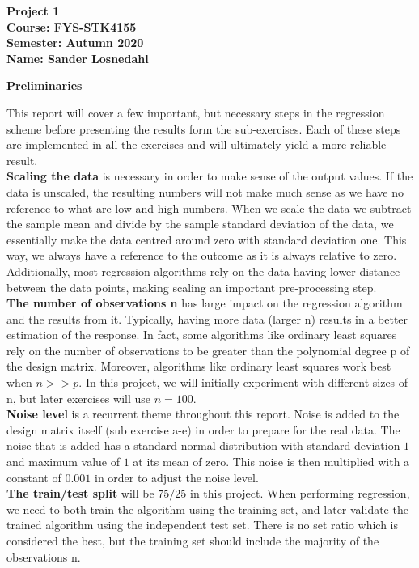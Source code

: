 \documentclass[12pt,a4paper]{article}
\begin{document}
\begin{center}
\LARGE{\textbf{Project 1}}
\\
\large{\textbf{Course: FYS-STK4155}}
\\
\large{\textbf{Semester: Autumn 2020}}
\\
\large{\textbf{Name: Sander Losnedahl}}
\end{center}


\newpage

\begin{center}
\Large{\textbf{Preliminaries}}
\end{center}

\noindent This report will cover a few important, but necessary steps in the regression scheme before presenting the results form the sub-exercises. Each of these steps are implemented in all the exercises and will ultimately yield a more reliable result.
\\
\textbf{Scaling the data} is necessary in order to make sense of the output values. If the data is unscaled, the resulting numbers will not make much sense as we have no reference to what are low and high numbers. When we scale the data we subtract the sample mean and divide by the sample standard deviation of the data, we essentially make the data centred around zero with standard deviation one. This way, we always have a reference to the outcome as it is always relative to zero. Additionally, most regression algorithms rely on the data having lower distance between the data points, making scaling an important pre-processing step.
\\
\textbf{The number of observations n} has large impact on the regression algorithm and the results from it. Typically, having more data (larger n) results in a better estimation of the response. In fact, some algorithms like ordinary least squares rely on the number of observations to be greater than the polynomial degree p of the design matrix. Moreover, algorithms like ordinary least squares work best when $n >> p$. In this project, we will initially experiment with different sizes of n, but later exercises will use $n = 100$.
\\
\textbf{Noise level} is a recurrent theme throughout this report. Noise is added to the design matrix itself (sub exercise a-e) in order to prepare for the real data. The noise that is added has a standard normal distribution with standard deviation $1$ and maximum value of $1$ at its mean of zero. This noise is then multiplied with a constant of $0.001$ in order to adjust the noise level. 
\\
\textbf{The train/test split} will be $75/25$ in this project. When performing regression, we need to both train the algorithm using the training set, and later validate the trained algorithm using the independent test set. There is no set ratio which is considered the best, but the training set should include the majority of the observations n. 
\end{document}
